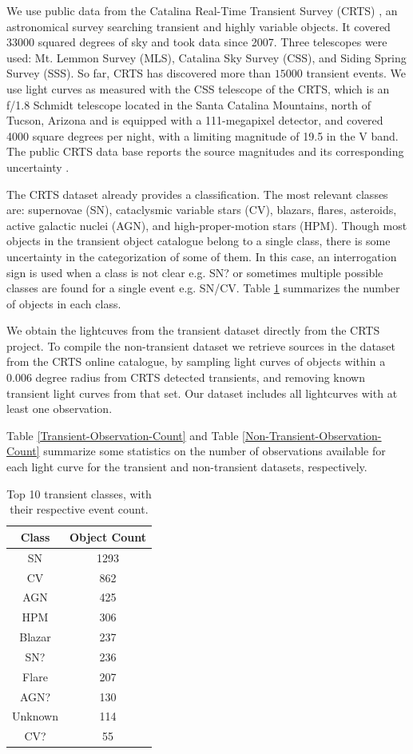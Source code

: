 \documentclass[a4paper,fleqn,usenatbib]{mnras}
\begin{document}
We use public data from the Catalina Real-Time Transient Survey
(CRTS) \citep{1111.2566}, an astronomical survey searching transient
and highly variable objects.   
It covered 33000 squared degrees of sky and took data since 2007.
Three telescopes were used: Mt. Lemmon Survey (MLS), Catalina Sky
Survey (CSS), and Siding Spring Survey (SSS). So far, CRTS has
discovered more than $15000$ transient events.
We use light curves as measured with the CSS telescope of the CRTS, which is
an f/1.8 Schmidt telescope located in the Santa Catalina Mountains, north of Tucson,
Arizona and is equipped with a 111-megapixel  detector, and covered
4000 square degrees per night, with a limiting magnitude of 19.5 in
the V band.  
The public CRTS data base reports the source magnitudes and its
corresponding uncertainty \citep{1996PASP..108..851S}.


The CRTS dataset already provides a classification. 
The most relevant classes are: supernovae (SN),
cataclysmic variable stars (CV), blazars, flares, asteroids, active
galactic nuclei (AGN), and high-proper-motion stars (HPM). 
Though most objects in the transient object catalogue belong to a single class,
there is some uncertainty in the categorization of some of
them. 
In this case, an interrogation sign is used when a class is not clear
e.g. SN? or sometimes multiple possible classes are found for a single
event e.g. SN/CV.
Table \ref{Top-Transient-Classes} summarizes the number of objects in
each class. 

We obtain the lightcuves from the transient dataset directly from
the CRTS project. 
To compile the non-transient dataset we retrieve sources in the
dataset from the CRTS online catalogue, by sampling light curves of
objects within a 0.006  degree radius from CRTS detected transients, and removing known
transient light curves from that set. 
Our dataset includes all lightcurves with at least one observation. 

Table \ref{Transient-Observation-Count} and
Table \ref{Non-Transient-Observation-Count} summarize some statistics
on the number of observations available for each light curve for the
transient and non-transient datasets, respectively.  


\begin{table}
\centering
\begin{tabular}{c|c}
    \hline
    Class &  Object Count \\
    \hline
    SN & 1293 \\
    CV & 862 \\
    AGN & 425 \\
    HPM & 306 \\
    Blazar & 237 \\
    SN? & 236 \\
    Flare & 207 \\
    AGN? & 130 \\
    Unknown & 114 \\
    CV? & 55 \\
    \hline
\end{tabular}
\caption{Top 10 transient classes, with their respective event count.}
\label{Top-Transient-Classes}
\end{table}
\end{document}

